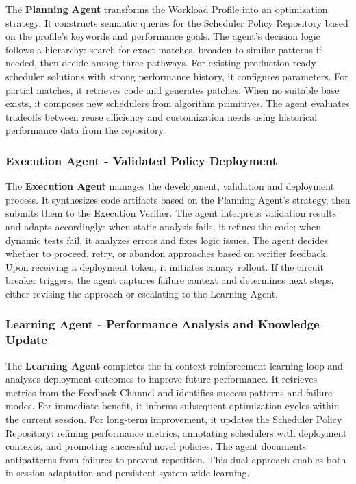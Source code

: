 \documentclass[preprint]{article}
\begin{document}
The \textbf{Planning Agent} transforms the Workload Profile into an optimization strategy. It constructs semantic queries for the Scheduler Policy Repository based on the profile's keywords and performance goals. The agent's decision logic follows a hierarchy: search for exact matches, broaden to similar patterns if needed, then decide among three pathways. For existing production-ready scheduler solutions with strong performance history, it configures parameters. For partial matches, it retrieves code and generates patches. When no suitable base exists, it composes new schedulers from algorithm primitives. The agent evaluates tradeoffs between reuse efficiency and customization needs using historical performance data from the repository.

\subsubsection{Execution Agent - Validated Policy Deployment}

The \textbf{Execution Agent} manages the development, validation and deployment process. It synthesizes code artifacts based on the Planning Agent's strategy, then submits them to the Execution Verifier. The agent interprets validation results and adapts accordingly: when static analysis fails, it refines the code; when dynamic tests fail, it analyzes errors and fixes logic issues. The agent decides whether to proceed, retry, or abandon approaches based on verifier feedback. Upon receiving a deployment token, it initiates canary rollout. If the circuit breaker triggers, the agent captures failure context and determines next steps, either revising the approach or escalating to the Learning Agent.

\subsubsection{Learning Agent - Performance Analysis and Knowledge Update}

The \textbf{Learning Agent} completes the in-context reinforcement learning loop and analyzes deployment outcomes to improve future performance. It retrieves metrics from the Feedback Channel and identifies success patterns and failure modes. For immediate benefit, it informs subsequent optimization cycles within the current session. For long-term improvement, it updates the Scheduler Policy Repository: refining performance metrics, annotating schedulers with deployment contexts, and promoting successful novel policies. The agent documents antipatterns from failures to prevent repetition. This dual approach enables both in-session adaptation and persistent system-wide learning.
\end{document}
